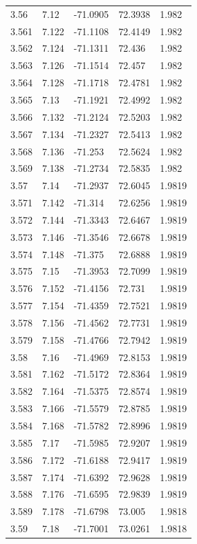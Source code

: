 \begin{tabular}{lllll}
3.56 & 7.12 & -71.0905 & 72.3938 & 1.982 \\
3.561 & 7.122 & -71.1108 & 72.4149 & 1.982 \\
3.562 & 7.124 & -71.1311 & 72.436 & 1.982 \\
3.563 & 7.126 & -71.1514 & 72.457 & 1.982 \\
3.564 & 7.128 & -71.1718 & 72.4781 & 1.982 \\
3.565 & 7.13 & -71.1921 & 72.4992 & 1.982 \\
3.566 & 7.132 & -71.2124 & 72.5203 & 1.982 \\
3.567 & 7.134 & -71.2327 & 72.5413 & 1.982 \\
3.568 & 7.136 & -71.253 & 72.5624 & 1.982 \\
3.569 & 7.138 & -71.2734 & 72.5835 & 1.982 \\
3.57 & 7.14 & -71.2937 & 72.6045 & 1.9819 \\
3.571 & 7.142 & -71.314 & 72.6256 & 1.9819 \\
3.572 & 7.144 & -71.3343 & 72.6467 & 1.9819 \\
3.573 & 7.146 & -71.3546 & 72.6678 & 1.9819 \\
3.574 & 7.148 & -71.375 & 72.6888 & 1.9819 \\
3.575 & 7.15 & -71.3953 & 72.7099 & 1.9819 \\
3.576 & 7.152 & -71.4156 & 72.731 & 1.9819 \\
3.577 & 7.154 & -71.4359 & 72.7521 & 1.9819 \\
3.578 & 7.156 & -71.4562 & 72.7731 & 1.9819 \\
3.579 & 7.158 & -71.4766 & 72.7942 & 1.9819 \\
3.58 & 7.16 & -71.4969 & 72.8153 & 1.9819 \\
3.581 & 7.162 & -71.5172 & 72.8364 & 1.9819 \\
3.582 & 7.164 & -71.5375 & 72.8574 & 1.9819 \\
3.583 & 7.166 & -71.5579 & 72.8785 & 1.9819 \\
3.584 & 7.168 & -71.5782 & 72.8996 & 1.9819 \\
3.585 & 7.17 & -71.5985 & 72.9207 & 1.9819 \\
3.586 & 7.172 & -71.6188 & 72.9417 & 1.9819 \\
3.587 & 7.174 & -71.6392 & 72.9628 & 1.9819 \\
3.588 & 7.176 & -71.6595 & 72.9839 & 1.9819 \\
3.589 & 7.178 & -71.6798 & 73.005 & 1.9818 \\
3.59 & 7.18 & -71.7001 & 73.0261 & 1.9818 \\

\end{tabular}
